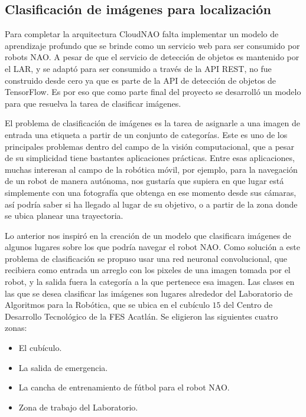\subsection{Clasificación de imágenes para localización}

Para completar la arquitectura CloudNAO falta implementar un modelo de aprendizaje 
profundo que se brinde como un servicio web para ser consumido por robots NAO.
A pesar de que el servicio de detección de objetos es mantenido por el LAR, y 
se adaptó para ser consumido a través de la API REST, no fue construido
desde cero ya que es parte de la API de detección de objetos de TensorFlow.
Es por eso que como parte final del proyecto se desarrolló un modelo para que 
resuelva la tarea de clasificar imágenes.

El problema de clasificación de imágenes es la tarea de asignarle a una imagen de
entrada una etiqueta a partir de un conjunto de categorías. Este es uno de los principales
problemas dentro del campo de la visión computacional, que a pesar de su simplicidad
tiene bastantes aplicaciones prácticas. Entre esas aplicaciones, muchas interesan al
campo de la robótica móvil, por ejemplo, para la navegación de un robot de manera
autónoma, nos gustaría que supiera en que lugar está simplemente con una fotografía
que obtenga en ese momento desde sus cámaras, así podría saber si ha llegado al 
lugar de su objetivo, o a partir de la zona donde se ubica planear una trayectoria.

Lo anterior nos inspiró en la creación de un modelo que clasificara imágenes
de algunos lugares sobre los que podría navegar el robot NAO. 
Como solución a este problema de clasificación se propuso usar 
una red neuronal convolucional, que recibiera como entrada un arreglo con los
pixeles de una imagen tomada por el robot, y la salida fuera la categoría
a la que pertenece esa imagen. 
Las clases en las que se desea clasificar las imágenes son lugares alrededor
del Laboratorio de Algoritmos para la Robótica, que se ubica en el cubículo $15$ del
Centro de Desarrollo Tecnológico de la FES Acatlán. Se eligieron las siguientes cuatro zonas:

\begin{itemize}
    \item El cubículo.
    \item La salida de emergencia.
    \item La cancha de entrenamiento de fútbol para el robot NAO.
    \item Zona de trabajo del Laboratorio.
\end{itemize}

